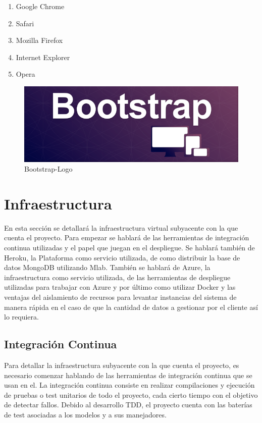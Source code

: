 \documentclass[a4paper,11pt]{book}
\begin{document}
\begin{enumerate}
\item Google Chrome
\item Safari
\item Mozilla Firefox 
\item Internet Explorer 
\item Opera  
\end{enumerate}

\begin{figure}[H] 
\centering 
\includegraphics[scale=0.25]{imagenes/desarrollo_herramienta/bootstrap.png}
\caption{ Bootstrap-Logo\cite{booL}  }  
\end{figure}   
 
 
\section{Infraestructura}

En esta sección se detallará la infraestructura virtual subyacente con la que cuenta el proyecto. Para empezar se hablará de las herramientas de integración continua utilizadas y el papel que juegan en el despliegue. Se hablará también de Heroku, la Plataforma como servicio utilizada, de como distribuir la base de datos MongoDB utilizando Mlab. También se hablará de Azure, la infraestructura como servicio utilizada, de las herramientas de despliegue utilizadas para trabajar con Azure y por último como utilizar Docker y las ventajas del aislamiento de recursos para levantar instancias del sistema de manera rápida en el caso de que la cantidad de datos a gestionar por el cliente así lo requiera. 

\subsection{Integración Continua}

Para detallar la infraestructura subyacente con la que cuenta el proyecto, es necesario comenzar hablando de las herramientas de integración continua que se usan en el. La integración continua consiste en realizar compilaciones y ejecución de pruebas o test unitarios de todo el proyecto, cada cierto tiempo con el objetivo de detectar fallos. Debido al desarrollo TDD, el proyecto cuenta con las baterías de test asociadas a los modelos y a sus manejadores.
\end{document}

